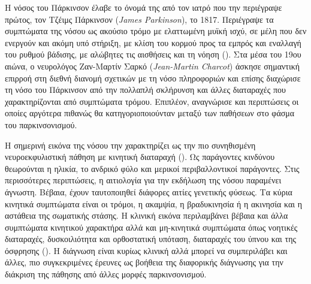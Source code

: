 \documentclass[12pt]{report}
\makeatletter
\let\oldchapter\chapter
\renewcommand{\chapter}{\@ifstar{\starchapter}{\nostarchapter}}
\newcommand{\starchapter}[1]{\oldchapter*{#1}\thispagestyle{mainstyle}}
\newcommand{\nostarchapter}[1]{\oldchapter{#1}\thispagestyle{mainstyle}}
\makeatother
\begin{document}
    \chapter{Εισαγωγή}
        Η νόσος του Πάρκινσον έλαβε το όνομά της από τον ιατρό που την περιέγραψε πρώτος, τον Τζέιμς Πάρκινσον (\emph{James Parkinson}), το 1817. Περιέγραψε τα συμπτώματα της νόσου ως ακούσιο τρόμο με ελαττωμένη μυϊκή ισχύ, σε μέλη που δεν ενεργούν και ακόμη υπό στήριξη, με κλίση του κορμού προς τα εμπρός και εναλλαγή του ρυθμού βάδισης, με αλώβητες τις αισθήσεις και τη νόηση (\emph{\cite{Goetz2011TheTherapies}}). Στα μέσα του 19ου αιώνα, ο νευρολόγος Ζαν-Μαρτίν Σαρκό (\emph{Jean-Martin Charcot}) άσκησε σημαντική επιρροή στη διεθνή διανομή σχετικών με τη νόσο πληροφοριών και επίσης διαχώρισε τη νόσο του Πάρκινσον από την πολλαπλή σκλήρυνση και άλλες διαταραχές που χαρακτηρίζονται από συμπτώματα τρόμου. Επιπλέον, αναγνώρισε και περιπτώσεις οι οποίες αργότερα πιθανώς θα κατηγοριοποιούνταν μεταξύ των παθήσεων στο φάσμα του παρκινσονισμού.
        \par
        Η σημερινή εικόνα της νόσου την χαρακτηρίζει ως την πιο συνηθισμένη νευροεκφυλιστική πάθηση με κινητική διαταραχή (\emph{\cite{Balestrino2020ParkinsonDisease}}). Ως παράγοντες κινδύνου θεωρούνται η ηλικία, το ανδρικό φύλο και μερικοί περιβαλλοντικοί παράγοντες. Στις περισσότερες περιπτώσεις, η αιτιολογία για την εκδήλωση της νόσου παραμένει άγνωστη. Βέβαια, έχουν ταυτοποιηθεί διάφορες αιτίες γενετικής φύσεως. Τα κύρια κινητικά συμπτώματα είναι οι τρόμοι, η ακαμψία, η βραδυκινησία ή η ακινησία και η αστάθεια της σωματικής στάσης. Η κλινική εικόνα περιλαμβάνει βέβαια και άλλα συμπτώματα κινητικού χαρακτήρα αλλά και μη-κινητικά συμπτώματα όπως νοητικές διαταραχές, δυσκοιλιότητα και ορθοστατική υπόταση, διαταραχές του ύπνου και της όσφρησης (\emph{\cite{Trevisan2024GeneticsPerspectives}}). Η διάγνωση είναι κυρίως κλινική αλλά μπορεί να συμπεριλάβει και άλλες, πιο συγκεκριμένες έρευνες ως βοήθεια της διαφορικής διάγνωσης για την διάκριση της πάθησης από άλλες μορφές παρκινσονισμού.
        
\end{document}
